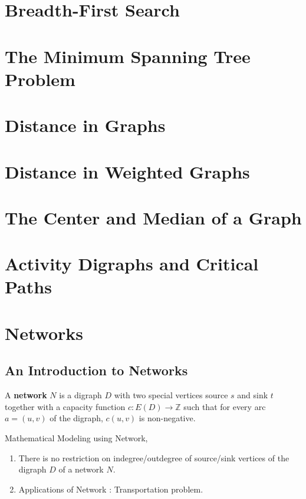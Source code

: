 \section{Breadth-First Search}
\section{The Minimum Spanning Tree Problem}

\section{Distance in Graphs}
\section{Distance in Weighted Graphs}
\section{The Center and Median of a Graph}
\section{Activity Digraphs and Critical Paths}

\section{Networks}
\subsection{An Introduction to Networks}
\begin{definition}
	A \textbf{network} $N$ is a digraph $D$ with two special vertices source $s$ and sink $t$ together with a capacity function $c : E(D) \to \mathbb{Z}$ such that for every arc $a = (u,v)$ of the digraph, $c(u,v)$ is non-negative.
\end{definition}

\begin{remark} Mathematical Modeling using Network,
	\begin{enumerate}
		\item There is no restriction on indegree/outdegree of source/sink vertices of the digraph $D$ of a network $N$.
		\item Applications of Network : Transportation problem.
	\end{enumerate}
\end{remark}

